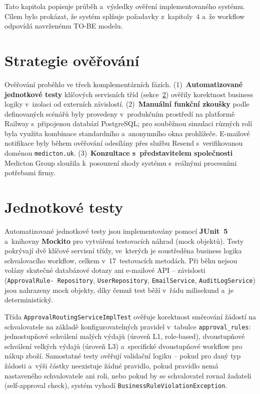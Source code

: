 Tato kapitola popisuje průběh a~výsledky ověření implementovaného
systému. Cílem bylo prokázat, že systém splňuje požadavky z~kapitoly~4
a~že workflow odpovídá navrženému TO-BE modelu.

\section{Strategie ověřování}

Ověřování proběhlo ve třech komplementárních fázích.
(1)~\textbf{Automatizované jednotkové testy} klíčových servisních
tříd (sekce~\ref{sec:unit-tests}) ověřily korektnost business logiky
v~izolaci od externích závislostí.
(2)~\textbf{Manuální funkční zkoušky} podle definovaných scénářů byly
provedeny v~produkčním prostředí na platformě Railway s~připojenou
databází PostgreSQL; pro souběžnou simulaci různých rolí byla využita
kombinace standardního a~anonymního okna prohlížeče. E-mailové
notifikace byly během ověřování odesílány přes službu Resend
s~verifikovanou doménou \texttt{medicton.uk}.
(3)~\textbf{Konzultace s~představitelem společnosti} Medicton Group
sloužila k~posouzení shody systému s~reálnými procesními potřebami
firmy.

\section{Jednotkové testy}\label{sec:unit-tests}

Automatizované jednotkové testy jsou implementovány pomocí
\textbf{JUnit~5} a~knihovny \textbf{Mockito} pro vytváření testovacích
náhrad (mock objektů). Testy pokrývají dvě klíčové servisní třídy,
ve~kterých je soustředěna business logika schvalovacího workflow,
celkem v~17~testovacích metodách. Při běhu nejsou volány skutečné
databázové dotazy ani e-mailové API -- závislosti (\texttt{ApprovalRule-
Repository}, \texttt{UserRepository}, \texttt{EmailService},
\texttt{AuditLogService}) jsou nahrazeny mock objekty, díky čemuž
test běží v~řádu milisekund a~je deterministický.

Třída \texttt{ApprovalRoutingServiceImplTest} ověřuje korektnost
směrování žádostí na schvalovatele na základě konfigurovatelných
pravidel v~tabulce \texttt{approval\_rules}: jednostupňové schválení
malých výdajů (úroveň L1, role-based), dvoustupňové schválení velkých
výdajů (úroveň L3) a~specifické dvoustupňové workflow pro nákup zboží.
Samostatné testy ověřují validační logiku -- pokud pro daný typ žádosti
a~výši částky neexistuje žádné pravidlo, pokud pravidlo nemá nastaveného
schvalovatele ani roli, nebo pokud by se schvalovatel rovnal žadateli
(self-approval check), systém vyhodí \texttt{BusinessRule\-Violation\-Exception}.

